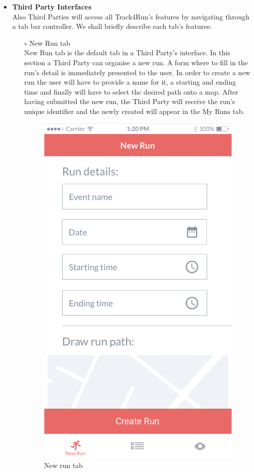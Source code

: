 \documentclass[titlepage]{article}
\begin{document}
\begin{itemize}
\begin{itemize}
				\item{\bf Third Party Interfaces} \\
			Also Third Parties will access all Track4Run’s features by navigating through a tab bar controller. We shall briefly describe each tab’s features:
				\begin{itemize}
					\item[$\circ$] New Run tab \\
					New Run tab is the default tab in a Third Party’s interface. In this section a Third Party can organise a new run. A form where to fill in the run’s detail is immediately presented to the user. In order to create a new run the user will have to provide a name for it, a starting and ending time and finally will have to select the desired path onto a map. After having submitted the new run, the Third Party will receive the run’s unique identifier and the newly created will appear in the My Runs tab.\\
					\begin{figure}[H]
						\center
  						\includegraphics[width=0.5\columnwidth]{Mockup/mockupNewRun.png}
  						\caption{New run tab}
 					 	\label{fig:NewRun}
					\end{figure}


\end{itemize}
\end{itemize}
\end{itemize}
\end{document}
